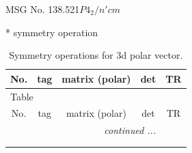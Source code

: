 \documentclass[fleqn,8pt]{jsarticle}
\begin{document}
\setcounter{MaxMatrixCols}{32}

\renewcommand{\tablename}{Table~}
\renewcommand{\figurename}{Figure~}
\begin{center}
\LARGE
MSG No. 138.521\quad$P4_{2}/n'cm$
\end{center}
* symmetry operation
\renewcommand{\arraystretch}{1.3}
\begin{longtable}{ccccc}
\caption{Symmetry operations for 3d polar vector.}
 \\
 \hline \hline
No. & tag & matrix (polar) & det & TR \\ \hline \endfirsthead

\multicolumn{4}{l}{\tablename\ \thetable{}} \\
 \hline \hline
No. & tag & matrix (polar) & det & TR \\ \hline \endhead

 \hline \hline
\multicolumn{4}{r}{\footnotesize\it continued ...} \\ \endfoot

 \hline \hline
\multicolumn{4}{r}{} \\ \endlastfoot


\end{longtable}
\end{document}
